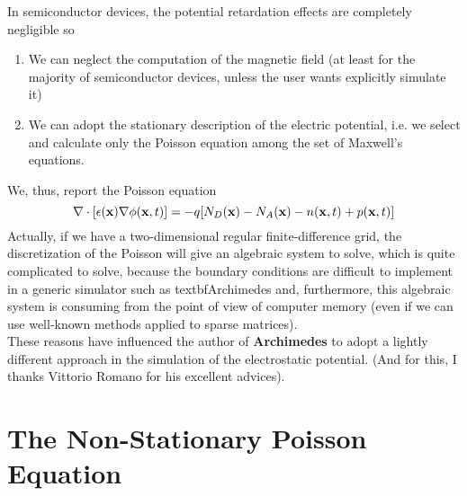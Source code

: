 \documentclass[12pt]{book}
\begin{document}
In semiconductor devices, the potential retardation effects are completely negligible so
\begin{enumerate}
\item
We can neglect the computation of the magnetic field (at least for the majority of semiconductor devices, unless the user wants explicitly simulate it)
\item
We can adopt the stationary description of the electric potential, i.e. we select and calculate only the Poisson equation among the set of Maxwell's equations.
\end{enumerate}
We, thus, report the Poisson equation
\begin{equation}
 \nabla \cdot [ \epsilon ({\bf{x}}) \nabla \phi ({\bf{x}},t) ] = 
 - q [ N_D({\bf{x}}) - N_A({\bf{x}}) - n({\bf{x}},t) + p({\bf{x}},t)]
\end{equation}
Actually, if we have a two-dimensional regular finite-difference grid,
the discretization of the Poisson will give an algebraic system to solve, which is quite complicated to solve, because the boundary conditions are difficult to implement in a generic simulator such as textbf{Archimedes} and, furthermore, this algebraic system is consuming from the point of view of computer memory (even if we can use well-known methods applied to sparse matrices).
\\
These reasons have influenced the author of \textbf{Archimedes} to adopt a lightly different approach in the simulation of the electrostatic potential. (And for this, I thanks Vittorio Romano for his excellent advices).

\section{The Non-Stationary Poisson Equation}
\end{document}
